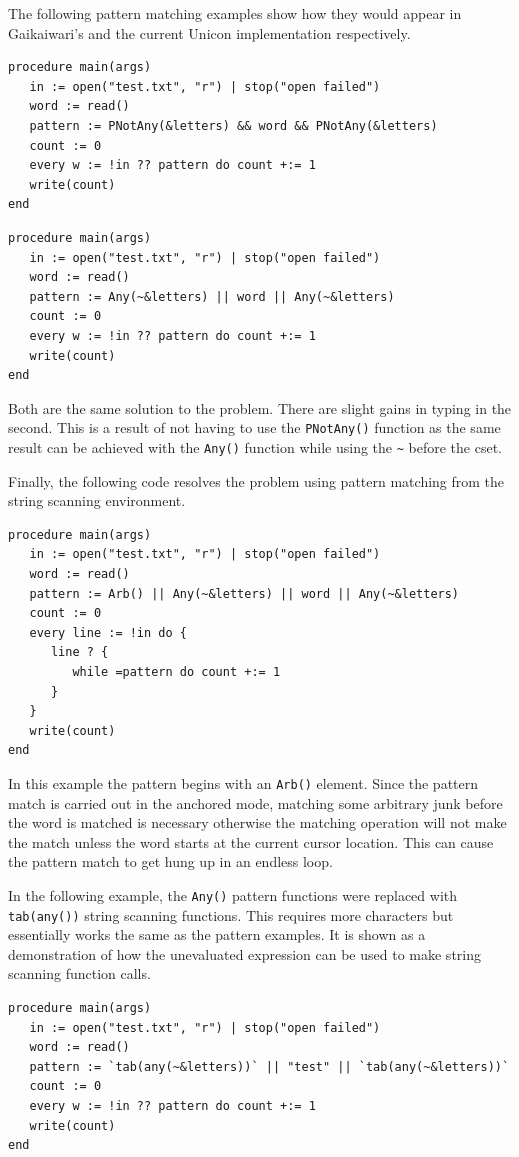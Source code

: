 \documentclass{article}
\begin{document}
The following pattern matching examples show how they would appear in Gaikaiwari's and the current Unicon implementation respectively.
\begin{verbatim}
procedure main(args)
   in := open("test.txt", "r") | stop("open failed")
   word := read()
   pattern := PNotAny(&letters) && word && PNotAny(&letters)
   count := 0
   every w := !in ?? pattern do count +:= 1
   write(count)
end
\end{verbatim}

\begin{verbatim}
procedure main(args)
   in := open("test.txt", "r") | stop("open failed")
   word := read()
   pattern := Any(~&letters) || word || Any(~&letters)
   count := 0
   every w := !in ?? pattern do count +:= 1
   write(count)
end
\end{verbatim}
Both are the same solution to the problem.  There are slight gains in typing in the second.  This is a result of not having to use the \texttt{PNotAny()} function as the same result can be achieved with the \texttt{Any()} function while using the \texttt{\~} before the cset.  

Finally, the following code resolves the problem using pattern matching from the string scanning environment.
\begin{verbatim}
procedure main(args)
   in := open("test.txt", "r") | stop("open failed")
   word := read()
   pattern := Arb() || Any(~&letters) || word || Any(~&letters)
   count := 0
   every line := !in do {
      line ? {
         while =pattern do count +:= 1
      }
   }
   write(count)
end
\end{verbatim}
In this example the pattern begins with an \texttt{Arb()} element.  Since the pattern match is carried out in the anchored mode, matching some arbitrary junk before the word is matched is necessary otherwise the matching operation will not make the match unless the word starts at the current cursor location.  This can cause the pattern match to get hung up in an endless loop.

In the following example, the \texttt{Any()} pattern functions were replaced with \texttt{tab(any())} string scanning functions.  This requires more characters but essentially works the same as the pattern examples.  It is shown as a demonstration of how the unevaluated expression can be used to make string scanning function calls.
\begin{verbatim}
procedure main(args)
   in := open("test.txt", "r") | stop("open failed")
   word := read()
   pattern := `tab(any(~&letters))` || "test" || `tab(any(~&letters))`
   count := 0
   every w := !in ?? pattern do count +:= 1
   write(count)
end
\end{verbatim}
\end{document}
